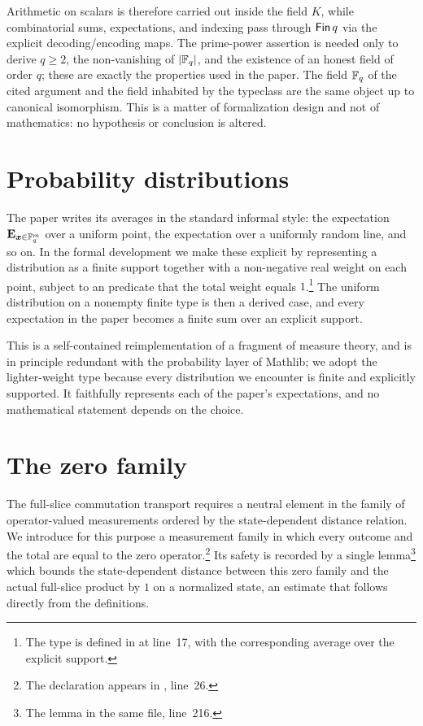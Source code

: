 \documentclass{article}
\begin{document}
Arithmetic on scalars is therefore carried out inside the field $K$,
while combinatorial sums, expectations, and indexing pass through
$\textsf{Fin}\,q$ via the explicit decoding/encoding maps. The
prime-power assertion is needed only to derive $q \ge 2$, the
non-vanishing of $|\mathbb{F}_q|$, and the existence of an honest field of
order $q$; these are exactly the properties used in the paper. The
field $\mathbb{F}_q$ of the cited argument and the field inhabited by the
typeclass are the same object up to canonical isomorphism. This is
a matter of formalization design and not of mathematics: no
hypothesis or conclusion is altered.

\section{Probability distributions}

The paper writes its averages in the standard informal style: the
expectation $\mathop{\bf E\/}_{{\boldsymbol{x}} \in \mathbb{F}_q^m}$ over a uniform point, the
expectation over a uniformly random line, and so on. In the formal
development we make these explicit by representing a distribution as
a finite support together with a non-negative real weight on each
point, subject to an  predicate that the total
weight equals $1$.\footnote{The type  is defined
in  at line~17, with
 the corresponding average over the explicit support.}
The uniform distribution on a nonempty finite type is then a derived
case, and every expectation in the paper becomes a finite sum over an
explicit support.

This is a self-contained reimplementation of a fragment of measure
theory, and is in principle redundant with the probability layer of
Mathlib; we adopt the lighter-weight type because every distribution
we encounter is finite and explicitly supported. It faithfully
represents each of the paper's expectations, and no mathematical
statement depends on the choice.

\section{The zero family}

The full-slice commutation transport requires a neutral element in
the family of operator-valued measurements ordered by the
state-dependent distance relation. We introduce for this purpose a
measurement family in which every outcome and the total are equal to
the zero operator.\footnote{The declaration
 appears in
,
line~26.}  Its safety is recorded by a single lemma\footnote{The
lemma  in the same
file, line~216.} which bounds the state-dependent distance between
this zero family and the actual full-slice product by $1$ on a
normalized state, an estimate that follows directly from the
definitions.
\end{document}
